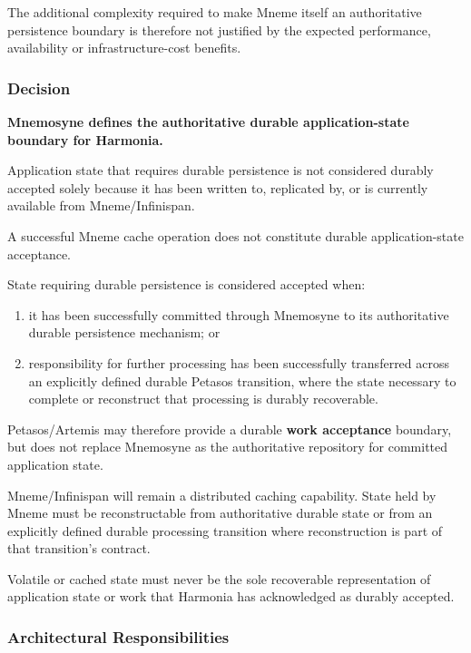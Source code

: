 The additional complexity required to make Mneme itself an authoritative persistence boundary is therefore not justified by the expected performance, availability or infrastructure-cost benefits.

\subsubsection{Decision}

\textbf{Mnemosyne defines the authoritative durable application-state boundary for Harmonia.}

Application state that requires durable persistence is not considered durably accepted solely because it has been written to, replicated by, or is currently available from Mneme/Infinispan.

A successful Mneme cache operation does not constitute durable application-state acceptance.

State requiring durable persistence is considered accepted when:
\begin{enumerate}
    \item it has been successfully committed through Mnemosyne to its authoritative durable persistence mechanism; or
    \item responsibility for further processing has been successfully transferred across an explicitly defined durable Petasos transition, where the state necessary to complete or reconstruct that processing is durably recoverable.
\end{enumerate}

Petasos/Artemis may therefore provide a durable \textbf{work acceptance} boundary, but does not replace Mnemosyne as the authoritative repository for committed application state.

Mneme/Infinispan will remain a distributed caching capability. State held by Mneme must be reconstructable from authoritative durable state or from an explicitly defined durable processing transition where reconstruction is part of that transition's contract.

Volatile or cached state must never be the sole recoverable representation of application state or work that Harmonia has acknowledged as durably accepted.

\subsubsection{Architectural Responsibilities}

